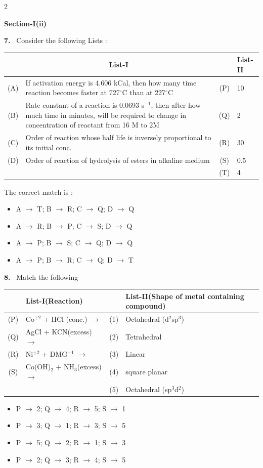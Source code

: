 \documentclass[10pt]{extarticle}
\newcommand{\sect}[1]{\par\smallskip\noindent\textbf{#1}\par}
\newcommand{\qn}[1]{\par\smallskip\noindent\textbf{#1.}~}
\newenvironment{qoptions}{\begin{itemize}[leftmargin=1.8em,itemsep=1pt,topsep=2pt,label={}]}{\end{itemize}}
\newcommand{\opt}[2]{\item[(#1)] #2}
\begin{document}
\begin{multicols}{2}
\sect{Section-I(ii)}

\qn{7} Consider the following Lists :\par\nobreak
\begin{center}\small\setlength{\tabcolsep}{3pt}
\begin{tabular}{|c|p{4.2cm}|c|p{0.8cm}|}
\hline
 & \multicolumn{1}{c|}{\textbf{List-I}} & & \textbf{List-II} \\
\hline
(A) & If activation energy is 4.606 kCal, then how many time reaction becomes faster at 727$^\circ$C than at 227$^\circ$C & (P) & 10 \\
\hline
(B) & Rate constant of a reaction is 0.0693 s$^{-1}$, then after how much time in minutes, will be required to change in concentration of reactant from 16 M to 2M & (Q) & 2 \\
\hline
(C) & Order of reaction whose half life is inversely proportional to its initial conc. & (R) & 30 \\
\hline
(D) & Order of reaction of hydrolysis of esters in alkaline medium & (S) & 0.5 \\
\hline
 & & (T) & 4 \\
\hline
\end{tabular}
\end{center}
The correct match is :
\begin{qoptions}
\opt{A}{A $\to$ T; B $\to$ R; C $\to$ Q; D $\to$ Q}
\opt{B}{A $\to$ R; B $\to$ P; C $\to$ S; D $\to$ Q}
\opt{C}{A $\to$ P; B $\to$ S; C $\to$ Q; D $\to$ Q}
\opt{D}{A $\to$ P; B $\to$ R; C $\to$ Q; D $\to$ T}
\end{qoptions}

\qn{8} Match the following\par\nobreak
\begin{center}\small\setlength{\tabcolsep}{3pt}
\begin{tabular}{|c|p{2.6cm}|c|p{2.6cm}|}
\hline
 & \textbf{List-I}\newline (Reaction) & & \textbf{List-II}\newline (Shape of metal containing compound) \\
\hline
(P) & Co$^{+2}$ + HCl (conc.) $\rightarrow$ & (1) & Octahedral (d$^2$sp$^3$) \\
\hline
(Q) & AgCl + KCN(excess) $\rightarrow$ & (2) & Tetrahedral \\
\hline
(R) & Ni$^{+2}$ + DMG$^{-1}$ $\rightarrow$ & (3) & Linear \\
\hline
(S) & Co(OH)$_2$ + NH$_3$(excess) $\rightarrow$ & (4) & square planar \\
\hline
 & & (5) & Octahedral (sp$^3$d$^2$) \\
\hline
\end{tabular}
\end{center}
\begin{qoptions}
\opt{A}{P $\to$ 2; Q $\to$ 4; R $\to$ 5; S $\to$ 1}
\opt{B}{P $\to$ 3; Q $\to$ 1; R $\to$ 3; S $\to$ 5}
\opt{C}{P $\to$ 5; Q $\to$ 2; R $\to$ 1; S $\to$ 3}
\opt{D}{P $\to$ 2; Q $\to$ 3; R $\to$ 4; S $\to$ 5}
\end{qoptions}


\end{multicols}
\end{document}
